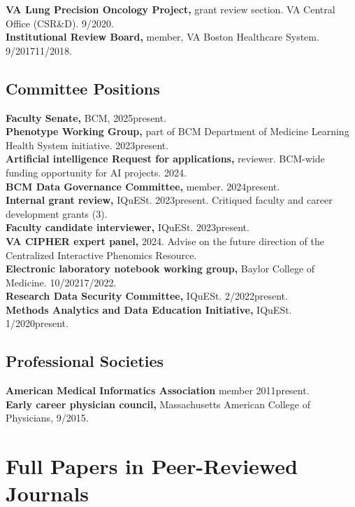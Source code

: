 \documentclass[10pt]{article}
\begin{document}
\textbf{VA Lung Precision Oncology Project,} grant review section. VA
Central Office (CSR\&D). 9/2020.\\
\textbf{Institutional Review Board,} member, VA Boston Healthcare System.
9/2017\ndash{}11/2018.

\subsection{Committee Positions}  %

\textbf{Faculty Senate,} BCM, 2025\ndash{}present.\\
\textbf{Phenotype Working Group,} part of BCM Department of Medicine
Learning Health System initiative. 2023\ndash{}present.\\
\textbf{Artificial intelligence Request for applications,} reviewer.
BCM-wide funding opportunity for AI projects. 2024.\\
\textbf{BCM Data Governance Committee,} member. 2024\ndash{}present.\\
\textbf{Internal grant review,} IQuESt. 2023\ndash{}present. Critiqued
faculty and career development grants (3).\\
\textbf{Faculty candidate interviewer,} IQuESt. 2023\ndash{}present.\\
\textbf{VA CIPHER expert panel,} 2024. Advise on the future direction
of the Centralized Interactive Phenomics Resource.\\
\textbf{Electronic laboratory notebook working group,} Baylor College
of Medicine. 10/2021\ndash{}7/2022.\\
\textbf{Research Data Security Committee,} IQuESt.
2/2022\ndash{}present.\\
\textbf{Methods Analytics and Data Education Initiative,} IQuESt.
1/2020\ndash{}present.

\subsection{Professional Societies} %

\textbf{American Medical Informatics Association} member
2011\ndash{}present.\\
\textbf{Early career physician council,} Massachusetts American
College of Physicians, 9/\ndash{}2015.



\section{Full Papers in Peer-Reviewed Journals} %
\end{document}
